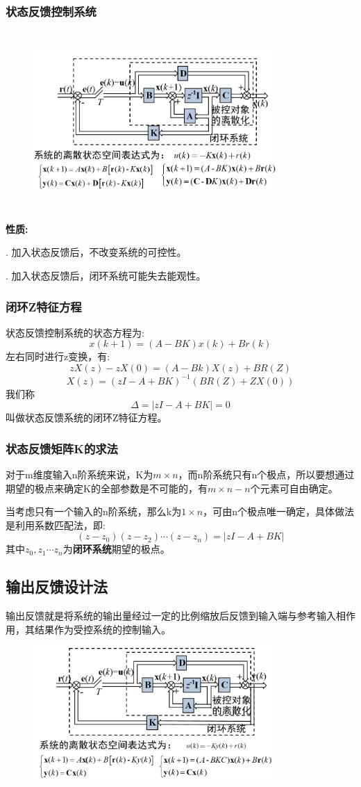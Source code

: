 \documentclass[12pt, a4paper, oneside]{ctexbook}
\begin{document}
\subsubsection{状态反馈控制系统}
\begin{figure}[htbp]
	\centering
	\includegraphics[width=9.3cm,height=6.8cm]{img/8_2.png}
\end{figure}
\noindent \textbf{性质:}

. 加入状态反馈后，不改变系统的可控性。

. 加入状态反馈后，闭环系统可能失去能观性。

\subsubsection{闭环Z特征方程}
\noindent 状态反馈控制系统的状态方程为:
$$
x(k+1)=(A-BK)x(k)+Br(k)
$$
左右同时进行z变换，有:
$$
zX(z)-zX(0)=(A-Bk)X(z)+BR(Z)
$$
$$
X(z)=(zI-A+BK)^{-1}(BR(Z)+ZX(0))
$$
我们称
$$
\Delta=|zI-A+BK|=0
$$
叫做状态反馈系统的闭环Z特征方程。
\subsubsection{状态反馈矩阵K的求法}
对于m维度输入n阶系统来说，K为$m\times n$，而n阶系统只有n个极点，所以要想通过期望的极点来确定K的全部参数是不可能的，有$m\times n-n$个元素可自由确定。

当考虑只有一个输入的n阶系统，那么k为$1\times n$，可由n个极点唯一确定，具体做法是利用系数匹配法，即:
$$
(z-z_0)(z-z_2)\cdots(z-z_n)=|zI-A+BK|
$$
其中$z_0,z_1\cdots z_n$为\textbf{闭环系统}期望的极点。
\subsection{输出反馈设计法}
输出反馈就是将系统的输出量经过一定的比例缩放后反馈到输入端与参考输入相作用，其结果作为受控系统的控制输入。
\begin{figure}[htbp]
	\centering
	\includegraphics[width=9.25cm,height=5.16cm]{img/8_3.png}
\end{figure}
\end{document}
